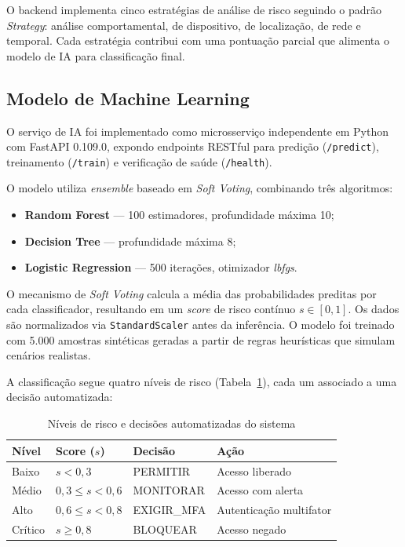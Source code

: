 \documentclass[12pt]{article}
\begin{document}
O backend implementa cinco estratégias de análise de risco seguindo o padrão \textit{Strategy}: análise comportamental, de dispositivo, de localização, de rede e temporal. Cada estratégia contribui com uma pontuação parcial que alimenta o modelo de IA para classificação final.

\subsection{Modelo de Machine Learning}

O serviço de IA foi implementado como microsserviço independente em Python com FastAPI 0.109.0, expondo endpoints RESTful para predição (\texttt{/predict}), treinamento (\texttt{/train}) e verificação de saúde (\texttt{/health}).

O modelo utiliza \textit{ensemble} baseado em \textit{Soft Voting}, combinando três algoritmos:

\begin{itemize}[leftmargin=*]
    \item \textbf{Random Forest} --- 100 estimadores, profundidade máxima 10;
    \item \textbf{Decision Tree} --- profundidade máxima 8;
    \item \textbf{Logistic Regression} --- 500 iterações, otimizador \textit{lbfgs}.
\end{itemize}

O mecanismo de \textit{Soft Voting} calcula a média das probabilidades preditas por cada classificador, resultando em um \textit{score} de risco contínuo $s \in [0, 1]$. Os dados são normalizados via \texttt{StandardScaler} antes da inferência. O modelo foi treinado com 5.000 amostras sintéticas geradas a partir de regras heurísticas que simulam cenários realistas.

A classificação segue quatro níveis de risco (Tabela~\ref{tab:risk_levels}), cada um associado a uma decisão automatizada:

\begin{table}[H]
\centering
\caption{Níveis de risco e decisões automatizadas do sistema}
\label{tab:risk_levels}
\small
\begin{tabular}{@{}llll@{}}
\toprule
\textbf{Nível} & \textbf{Score ($s$)} & \textbf{Decisão} & \textbf{Ação} \\
\midrule
Baixo    & $s < 0{,}3$          & PERMITIR                   & Acesso liberado \\
Médio    & $0{,}3 \leq s < 0{,}6$ & MONITORAR                  & Acesso com alerta \\
Alto     & $0{,}6 \leq s < 0{,}8$ & EXIGIR\_MFA                & Autenticação multifator \\
Crítico  & $s \geq 0{,}8$       & BLOQUEAR                   & Acesso negado \\
\bottomrule
\end{tabular}
\end{table}
\end{document}
